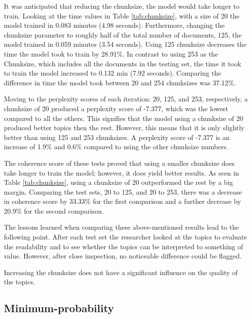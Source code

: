 It was anticipated that reducing the chunksize, the model would take longer to train. Looking at the time values in Table \ref{tab:chunksize}, with a size of 20 the model trained in 0.083 minutes (4.98 seconds). Furthermore, changing the chunksize parameter to roughly half of the total number of documents, 125, the model trained in 0.059 minutes (3.54 seconds). Using 125 chunksize decreases the time the model took to train by 28.91\%. In contrast to using 253 as the Chunksize, which includes all the documents in the testing set, the time it took to train the model increased to 0.132 min (7.92 seconds). Comparing the difference in time the model took between 20 and 254 chunksizes was 37.12\%.

Moving to the perplexity scores of each iteration: 20, 125, and 253, respectively, a chunksize of 20 produced a perplexity score of -7.377, which was the lowest compared to all the others. This signifies that the model using a chunksize of 20 produced better topics then the rest. However, this means that it is only slightly better than using 125 and 253 chunksizes. A perplexity score of -7.377 is an increase of 1.9\% and 0.6\% compared to using the other chunksize numbers.

The coherence score of these tests proved that using a smaller chunksize does take longer to train the model; however, it does yield better results. As seen in Table \ref{tab:chunksize}, using a chunksize of 20 outperformed the rest by a big margin. Comparing the test sets, 20 to 125, and 20 to 253, there was a decrease in coherence score by 33.33\% for the first comparison and a further decrease by 20.9\% for the second comparison.

The lessons learned when comparing these above-mentioned results lead to the following point. After each test set the researcher looked at the topics to evaluate the readability and to see whether the topics can be interpreted to something of value. However, after close inspection, no noticeable difference could be flagged.

\begin{lesson}
Increasing the chunksize does not have a significant influence on the quality of the topics.
\end{lesson}\label{L:chunksize}

\subsection{Minimum-probability}

